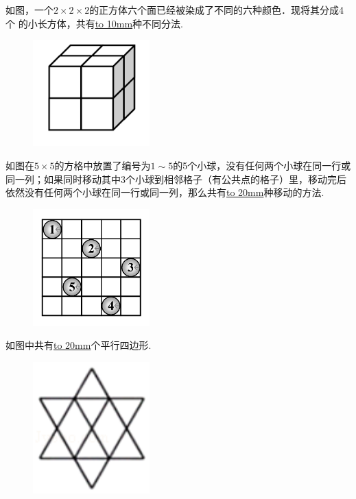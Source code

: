 \item {
    如图，一个$2\times 2\times 2$的正方体六个面已经被染成了不同的六种颜色．现将其分成4个 的小长方体，共有\underline{\hbox to 10mm{}}种不同分法.
    \begin{figure}[H] 
        \centering
        \includegraphics[width=0.4\textwidth]{./pics/Chapter_6/15.png}
    \end{figure}
}

\item {
    如图在$5\times 5$的方格中放置了编号为$1\sim 5$的5个小球，没有任何两个小球在同一行或同一列；如果同时移动其中3个小球到相邻格子（有公共点的格子）里，移动完后依然没有任何两个小球在同一行或同一列，那么共有\underline{\hbox to 20mm{}}种移动的方法.
    \begin{figure}[H] 
        \centering
        \includegraphics[width=0.4\textwidth]{./pics/Chapter_6/23.png}
    \end{figure}
}


\item {
    如图中共有\underline{\hbox to 20mm{}}个平行四边形.
    \begin{figure}[H] 
        \centering
        \includegraphics[width=0.4\textwidth]{./pics/Chapter_6/2017_1.png}
    \end{figure}
}

